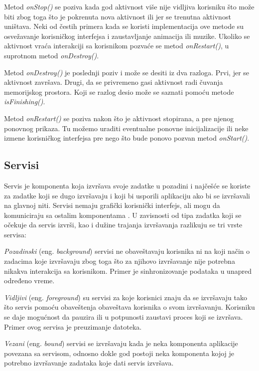 \documentclass[android.tex]{subfiles}
\begin{document}
Metod \textit{onStop()} se poziva kada god aktivnost više nije vidljiva korisniku što može biti zbog toga što je pokrenuta nova aktivnost ili jer se trenutna aktivnost uništava. Neki od čestih primera kada se koristi implementacija ove metode su osvežavanje korisničkog interfejsa i zaustavljanje animacija ili muzike. Ukoliko se aktivnost vraća interakciji sa korisnikom pozvaće se metod \textit{onRestart()}, u suprotnom metod \textit{onDestroy()}.

Metod \textit{onDestroy()} je poslednji poziv i može se desiti iz dva razloga. Prvi, jer se aktivnost završava. Drugi, da se privremeno gasi aktivnost radi čuvanja memorijskog prostora. Koji se razlog desio može se saznati pomoću metode \textit{isFinishing()}.

Metod \textit{onRestart() }se poziva nakon što je aktivnost stopirana, a pre njenog ponovnog prikaza. Tu možemo uraditi eventualne ponovne inicijalizacije ili neke izmene korisničkog interfejsa pre nego što bude ponovo pozvan metod \textit{onStart()}.

\subsection{Servisi}
Servis je komponenta koja izvršava svoje zadatke u pozadini i najčešće se koriste za zadatke koji se dugo izvršavaju i koji bi usporili aplikaciju ako bi se izvršavali na glavnoj niti. Servisi nemaju grafički korisnički interfejs, ali mogu da komuniciraju sa ostalim komponentama \cite{book:hellman}. U zavisnosti od tipa zadatka koji se očekuje da servis izvrši, kao i dužine trajanja izvršavanja razlikuju se tri vrste servisa:
\begin{description}
    \item \textit{Pozadinski} (eng. \textit{background}) servisi ne obaveštavaju korisnika ni na koji način o zadacima koje izvršavaju zbog toga što za njihovo izvršavanje nije potrebna nikakva interakcija sa korisnikom. Primer je sinhronizovanje podataka u unapred određeno vreme.  
    \item \textit{Vidljivi} (eng. \textit{foreground}) su servisi za koje korisnici znaju da se izvršavaju tako što servis pomoću obaveštenja obaveštava korisnika o svom izvršavanju. Korisniku se daje mogućnost da pauzira ili u potpunosti zaustavi proces koji se izvršava. Primer ovog servisa je preuzimanje datoteka.
    \item \textit{Vezani} (eng. \textit{bound}) servisi se izvršavaju kada je neka komponenta aplikacije povezana sa servisom, odnosno dokle god postoji neka komponenta kojoj je potrebno izvršavanje zadataka koje dati servis izvršava.
\end{description}
\end{document}
